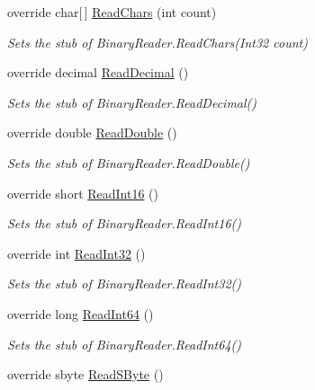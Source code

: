 \begin{DoxyCompactItemize}
override char\mbox{[}$\,$\mbox{]} \hyperlink{class_system_1_1_i_o_1_1_fakes_1_1_stub_binary_reader_ab26573ebb187ef5bec9d0c12dcc6f764}{Read\-Chars} (int count)
\begin{DoxyCompactList}\small\item\em Sets the stub of Binary\-Reader.\-Read\-Chars(\-Int32 count)\end{DoxyCompactList}\item 
override decimal \hyperlink{class_system_1_1_i_o_1_1_fakes_1_1_stub_binary_reader_a17e620a2290340b58ee5564d00b5ce1b}{Read\-Decimal} ()
\begin{DoxyCompactList}\small\item\em Sets the stub of Binary\-Reader.\-Read\-Decimal()\end{DoxyCompactList}\item 
override double \hyperlink{class_system_1_1_i_o_1_1_fakes_1_1_stub_binary_reader_a8ea7c8a416b249f413c25a014b1b5bf5}{Read\-Double} ()
\begin{DoxyCompactList}\small\item\em Sets the stub of Binary\-Reader.\-Read\-Double()\end{DoxyCompactList}\item 
override short \hyperlink{class_system_1_1_i_o_1_1_fakes_1_1_stub_binary_reader_ac93ca65f89a7f94004f8e74a061fe4c6}{Read\-Int16} ()
\begin{DoxyCompactList}\small\item\em Sets the stub of Binary\-Reader.\-Read\-Int16()\end{DoxyCompactList}\item 
override int \hyperlink{class_system_1_1_i_o_1_1_fakes_1_1_stub_binary_reader_a681349d2c5a7c15ac240c4aa6198d342}{Read\-Int32} ()
\begin{DoxyCompactList}\small\item\em Sets the stub of Binary\-Reader.\-Read\-Int32()\end{DoxyCompactList}\item 
override long \hyperlink{class_system_1_1_i_o_1_1_fakes_1_1_stub_binary_reader_a38f56cc2463bb9b1c599fcd4625b093e}{Read\-Int64} ()
\begin{DoxyCompactList}\small\item\em Sets the stub of Binary\-Reader.\-Read\-Int64()\end{DoxyCompactList}\item 
override sbyte \hyperlink{class_system_1_1_i_o_1_1_fakes_1_1_stub_binary_reader_a7c643946f0eb9a875b1d7db0f0730bdb}{Read\-S\-Byte} ()

\end{DoxyCompactItemize}
